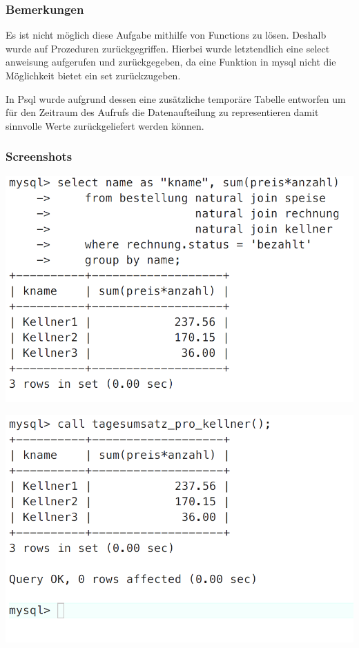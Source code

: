 \subsubsection{Bemerkungen}
Es ist nicht möglich diese Aufgabe mithilfe von Functions zu lösen. Deshalb wurde auf Prozeduren zurückgegriffen.
Hierbei wurde letztendlich eine select anweisung aufgerufen und zurückgegeben, da eine Funktion in mysql nicht die Möglichkeit bietet ein set zurückzugeben.

In Psql wurde aufgrund dessen eine zusätzliche temporäre Tabelle entworfen um für den Zeitraum des Aufrufs die Datenaufteilung zu representieren damit sinnvolle Werte zurückgeliefert werden können.

\clearpage

\subsubsection{Screenshots}
\vspace{0.2cm}
\begin{minipage}{.5\textwidth}
	\includegraphics[width=1\linewidth]{images/s11.png}
\end{minipage}%
\begin{minipage}{.5\textwidth}
	\includegraphics[width=1\linewidth]{images/s12.png}
\end{minipage}

\clearpage


